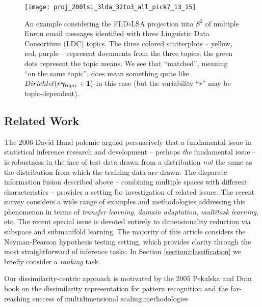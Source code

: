 \documentclass[12pt,xcolor]{article}
\newcommand{\1}{\ensuremath{\mbox{{\bf 1}}}}
\begin{document}
\begin{figure}[h]
\begin{center}
\texttt{[image: proj\_200lsi\_3lda\_32to3\_all\_pick7\_13\_15]}
\caption{An example considering the FLD$\circ$LSA projection into $S^2$ of multiple
Enron email messages identified with three Linguistic Data Consortium (LDC) topics.
The three colored scatterplots -- yellow, red, purple -- represent documents from the three topics;
the green dots represent the topic means.
We see that ``matched'', meaning ``on the same topic'', does mean something quite like $Dirichlet(r\bm{\gamma}_{topic}+\1)$ in this case
(but the variability ``$r$'' may be topic-dependent).
}\label{fig:MingSun1}
\end{center}
\end{figure}

\subsection{Related Work}

The 2006 David Hand polemic \cite{citeulike:3480824}
argued persuasively that a fundamental issue in statistical inference research and development
-- perhaps {\em the} fundamental issue --
is robustness in the face of test data drawn from a distribution {\em not} the same
as the distribution from which the training data are drawn.
The disparate information fusion described above --
combining multiple spaces with different characteristics --
provides a setting for investigation of related issues.
The recent survey \cite{TransferSurvey} considers a wide range of examples and methodologies addressing this phenomenon
in terms of {\it transfer learning}, {\it domain adaptation}, {\it multitask learning}, etc.
The recent special issue \cite{5714387} 
is devoted entirely to dimensionality reduction via subspace and submanifold learning.
The majority of this article considers the Neyman-Pearson hypothesis testing setting,
which provides clarity through the most straightforward of inference tasks.
In Section \ref{section:classification} we briefly consider a {\em ranking} task.

Our dissimilarity-centric approach is motivated by
the 2005 Pekalska and Duin book \cite{1197035} on the dissimilarity representation for pattern recognition
and the far-reaching success of multidimensional scaling methodologies \cite{T52,T58,CC01,BG05}
\end{document}
